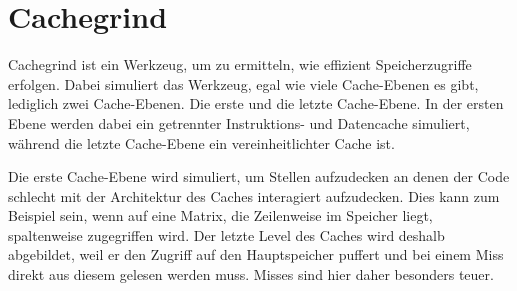 \section{Cachegrind}
Cachegrind ist ein Werkzeug, um zu ermitteln, wie effizient Speicherzugriffe erfolgen. Dabei simuliert das Werkzeug, egal wie viele Cache-Ebenen es gibt, lediglich zwei Cache-Ebenen. Die erste und die letzte Cache-Ebene. In der ersten Ebene werden dabei ein getrennter Instruktions- und Datencache simuliert, während die letzte Cache-Ebene ein vereinheitlichter Cache ist.

Die erste Cache-Ebene wird simuliert, um Stellen aufzudecken an denen der Code schlecht mit der Architektur des Caches interagiert aufzudecken. Dies kann zum Beispiel sein, wenn auf eine Matrix, die Zeilenweise im Speicher liegt, spaltenweise zugegriffen wird. Der letzte Level des Caches wird deshalb abgebildet, weil er den Zugriff auf den Hauptspeicher puffert und bei einem Miss direkt aus diesem gelesen werden muss. Misses sind hier daher besonders teuer. 